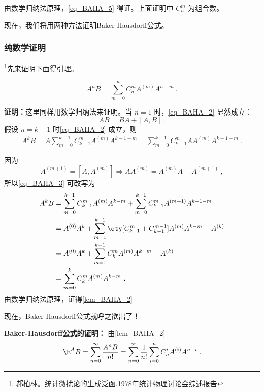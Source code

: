 由数学归纳法原理，\autoref{eq_BAHA_5} 得证。上面证明中 $C_n^m$ 为组合数。

现在，我们将用两种方法证明Baker-Hausdorff公式。
\subsubsection{纯数学证明}
\footnote{郝柏林。统计微扰论的生成泛函.1978年统计物理讨论会综述报告}先来证明下面得引理。
\begin{lemma}{}\label{lem_BAHA_2}
\begin{equation}\label{eq_BAHA_2}
A^nB=\sum_{m=0}^{n}C_{n}^mA^{(m)}A^{n-m}~.
\end{equation}
\end{lemma}
\textbf{证明：}这里同样用数学归纳法来证明。当 $n=1$ 时，\autoref{eq_BAHA_2} 显然成立：
\begin{equation}
AB=BA+[A,B]~.
\end{equation}
假设 $n=k-1$ 时\autoref{eq_BAHA_2} 成立，则
\begin{equation}\label{eq_BAHA_3}
\begin{aligned}
A^{k}B=A\sum_{m=0}^{k-1}C_{k-1}^mA^{(m)}A^{k-1-m}=\sum_{m=0}^{k-1}C_{k-1}^mAA^{(m)}A^{k-1-m}~.
\end{aligned}
\end{equation}

因为
\begin{equation}
A^{(m+1)}=[A,A^{(m)}]\Rightarrow AA^{(m)}=A^{(m)}A+A^{(m+1)}~,
\end{equation}
所以\autoref{eq_BAHA_3} 可改写为
\begin{equation}
\begin{aligned}
A^k B&=\sum_{m=0}^{k-1}C_{k-1}^mA^{(m)}A^{k-m}+\sum_{m=0}^{k-1}C_{k-1}^mA^{(m+1)}A^{k-1-m}\\
&=A^{(0)}A^{k}+\sum_{m=1}^{k-1}\qty[C_{k-1}^m+C_{k-1}^{m-1}]A^{(m)}A^{k-m}+A^{(k)}\\
&=A^{(0)}A^{k}+\sum_{m=1}^{k-1}C_{k}^mA^{(m)}A^{k-m}+A^{(k)}\\
&=\sum_{m=0}^{k}C_{k}^mA^{(m)}A^{k-m}~.
\end{aligned}
\end{equation}
由数学归纳法原理，证得\autoref{lem_BAHA_2} 

现在，Baker-Hausdorff公式就呼之欲出了！

\textbf{Baker-Hausdorff公式的证明：}
由\autoref{lem_BAHA_2} 
\begin{equation}\label{eq_BAHA_4}
\E^A B=\sum_{n=0}^{\infty}\frac{A^nB}{n!}=\sum_{n=0}^{\infty}\frac{1}{n!}\sum_{i=0}^{n}C_{n}^iA^{(i)}A^{n-i}~.
\end{equation}

